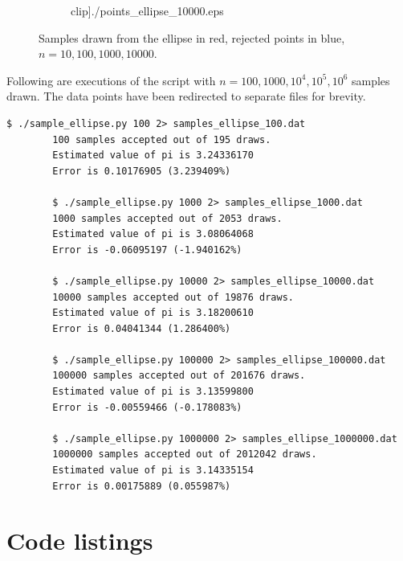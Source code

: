 \documentclass[10pt]{article}
\begin{document}
\begin{figure}[H]
\begin{subfigure}{0.45\textwidth}
        clip]{./points_ellipse_10000.eps}
    \end{subfigure}
    \caption{Samples drawn from the ellipse in red, rejected points in blue, $n =
    10, 100, 1000, 10000$.}
    \end{figure}
    
    Following are executions of the script with $n = 100, 1000, 10^4, 10^5, 10^6$
    samples drawn. The data points have been redirected to separate files for
    brevity.
    
    \begin{lstlisting}[numbers=none, basicstyle=\ttfamily]
        $ ./sample_ellipse.py 100 2> samples_ellipse_100.dat
        100 samples accepted out of 195 draws.
        Estimated value of pi is 3.24336170
        Error is 0.10176905 (3.239409%)
        
        $ ./sample_ellipse.py 1000 2> samples_ellipse_1000.dat
        1000 samples accepted out of 2053 draws.
        Estimated value of pi is 3.08064068
        Error is -0.06095197 (-1.940162%)

        $ ./sample_ellipse.py 10000 2> samples_ellipse_10000.dat
        10000 samples accepted out of 19876 draws.
        Estimated value of pi is 3.18200610
        Error is 0.04041344 (1.286400%)
            
        $ ./sample_ellipse.py 100000 2> samples_ellipse_100000.dat
        100000 samples accepted out of 201676 draws.
        Estimated value of pi is 3.13599800
        Error is -0.00559466 (-0.178083%)

        $ ./sample_ellipse.py 1000000 2> samples_ellipse_1000000.dat
        1000000 samples accepted out of 2012042 draws.
        Estimated value of pi is 3.14335154
        Error is 0.00175889 (0.055987%)
    \end{lstlisting}
    

    \section{Code listings}\label{sec:code_listing}

    
    
    

    
    
    
\end{document}
